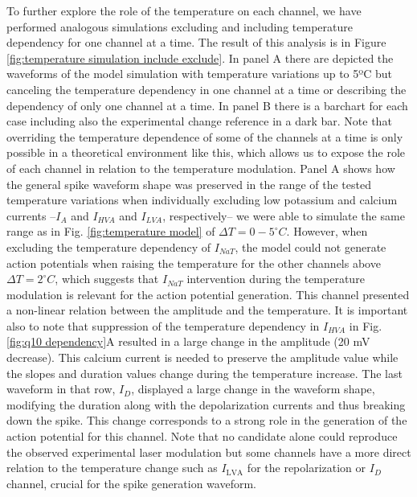 To further explore the role of the temperature on each channel, we have performed analogous simulations excluding and including temperature dependency for one channel at a time. The result of this analysis is in Figure \ref{fig:temperature simulation include exclude}. In panel A there are depicted the waveforms of the model simulation with temperature variations up to 5ºC but canceling the temperature dependency in one channel at a time or describing the dependency of only one channel at a time. In panel B there is a barchart for each case including also the experimental change reference in a dark bar. Note that overriding the temperature dependence of some of the channels at a time is only possible in a theoretical environment like this, which allows us to expose the role of each channel in relation to the temperature modulation. Panel A shows how the general spike waveform shape was preserved in the range of the tested temperature variations when individually excluding low potassium and calcium currents --$I_{A}$ and $I_{HVA}$ and $I_{LVA}$, respectively-- we were able to simulate the same range as in Fig. \ref{fig:temperature model} of $\Delta T=0-5 ^{\circ}C$. However, when excluding the temperature dependency of $I_{NaT}$, the model could not generate action potentials when raising the temperature for the other channels above $\Delta T=2 ^{\circ}C$, which suggests that $I_{NaT}$ intervention during the temperature modulation is relevant for the action potential generation. This channel presented a non-linear relation between the amplitude and the temperature. It is important also to note that suppression of the temperature dependency in $I_{HVA}$ in Fig. \ref{fig:q10 dependency}A resulted in a large change in the amplitude (20 mV decrease). This calcium current is needed to preserve the amplitude value while the slopes and duration values change during the temperature increase. The last waveform in that row, $I_D$, displayed a large change in the waveform shape, modifying the duration along with the depolarization currents and thus breaking down the spike. This change corresponds to a strong role in the generation of the action potential for this channel. 
Note that no candidate alone could reproduce the observed experimental laser modulation but some channels have a more direct relation to the temperature change such as  $I_{\textrm{LVA}}$ for the repolarization or $I_{D}$ channel, crucial for the spike generation waveform.




